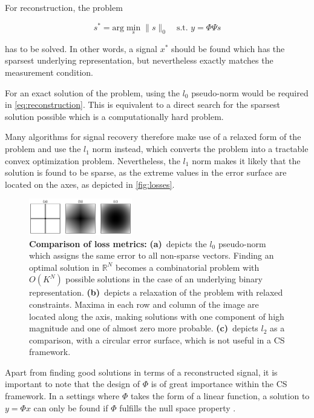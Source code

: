 \documentclass[10pt,twocolumn,a4paper]{article}
\newcommand{\IR}{\mathds{R}}
\newcommand{\la}{\textbf{(a)}~}
\newcommand{\lb}{\textbf{(b)}~}
\newcommand{\lc}{\textbf{(c)}~}
\newcommand{\Basis}{\Psi}
\newcommand{\Measure}{\Phi}
\begin{document}
For reconstruction, the problem

\begin{equation}
    s^* = \text{arg}\min_{s} \|s\|_0 \quad \text{s.t. } y = \Measure \Basis s
\label{eq:reconstruction}
\end{equation}

has to be solved.
In other words, a signal $x^*$ should be found which has the sparsest underlying representation, but nevertheless exactly matches the measurement condition.

For an exact solution of the problem, using the $l_0$ pseudo-norm would be required in \eqref{eq:reconstruction}.
This is equivalent to a direct search for the sparsest solution possible which is a computationally hard problem.

Many algorithms for signal recovery therefore make use of a relaxed form of the problem and use the $l_1$ norm instead, which converts the problem into a tractable convex optimization problem.
Nevertheless, the $l_1$ norm makes it likely that the solution is found to be sparse, as the extreme values in the error surface are located on the axes, as depicted in \autoref{fig:losses}.

\begin{figure}
    \centering
\includegraphics[width=0.4\textwidth]{fig/losses}
    \caption{\textbf{Comparison of loss metrics:}
        \la depicts the $l_0$ pseudo-norm which assigns the same error to all non-sparse vectors. Finding an optimal solution in $\IR^N$ becomes a combinatorial problem with $O(K^N)$ possible solutions in the case of an underlying binary representation.
        \lb depicts a relaxation of the problem with relaxed constraints.
        Maxima in each row and column of the image are located along the axis, making solutions with one component of high magnitude and one of almost zero more probable.
        \lc depicts $l_2$ as a comparison, with a circular error surface, which is not useful in a CS framework.
    }
\label{fig:losses}
\end{figure}

Apart from finding good solutions in terms of a reconstructed signal, it is important to note that the design of $\Measure$ is of great importance within the CS framework.
In a settings where $\Measure$ takes the form of a linear function, a solution to $y = \Measure x$ can only be found if $\Measure$ fulfills the null space property \cite{Donoho2006}.
\end{document}
